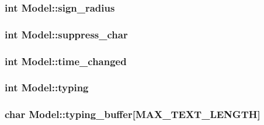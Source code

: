 \subsubsection[{\texorpdfstring{sign\+\_\+radius}{sign_radius}}]{\setlength{\rightskip}{0pt plus 5cm}int Model\+::sign\+\_\+radius}\hypertarget{structModel_a27a1d8e175370c2b238acb4e6f68e9b7}{}\label{structModel_a27a1d8e175370c2b238acb4e6f68e9b7}
\subsubsection[{\texorpdfstring{suppress\+\_\+char}{suppress_char}}]{\setlength{\rightskip}{0pt plus 5cm}int Model\+::suppress\+\_\+char}\hypertarget{structModel_a71a28fca3a64903ea725641e4f63030b}{}\label{structModel_a71a28fca3a64903ea725641e4f63030b}
\subsubsection[{\texorpdfstring{time\+\_\+changed}{time_changed}}]{\setlength{\rightskip}{0pt plus 5cm}int Model\+::time\+\_\+changed}\hypertarget{structModel_aa4050c23342bfe2f344466b2e99dd3cb}{}\label{structModel_aa4050c23342bfe2f344466b2e99dd3cb}
\subsubsection[{\texorpdfstring{typing}{typing}}]{\setlength{\rightskip}{0pt plus 5cm}int Model\+::typing}\hypertarget{structModel_a2fcef6db45ecfe5abca7e531c3edd58d}{}\label{structModel_a2fcef6db45ecfe5abca7e531c3edd58d}
\subsubsection[{\texorpdfstring{typing\+\_\+buffer}{typing_buffer}}]{\setlength{\rightskip}{0pt plus 5cm}char Model\+::typing\+\_\+buffer\mbox{[}{\bf M\+A\+X\+\_\+\+T\+E\+X\+T\+\_\+\+L\+E\+N\+G\+TH}\mbox{]}}\hypertarget{structModel_a69f3bc4862cb7190f7d28013da4fe629}{}\label{structModel_a69f3bc4862cb7190f7d28013da4fe629}
